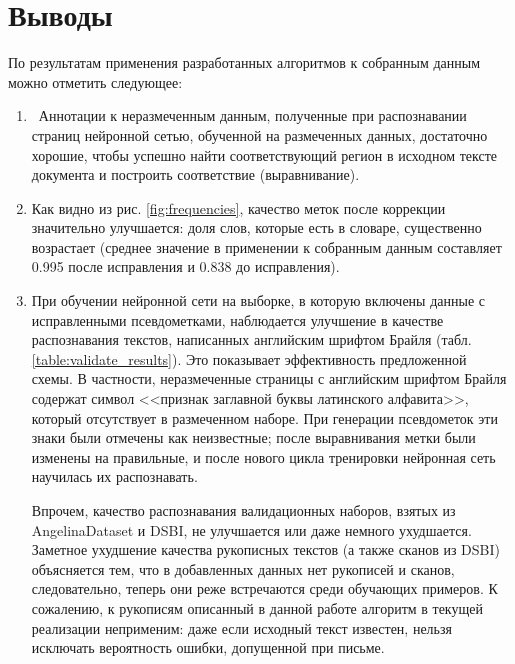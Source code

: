 \documentclass{main.tex}[subfiles]
\begin{document}
\newpage
\section{Выводы}

По результатам применения разработанных алгоритмов к собранным данным можно отметить следующее:
\begin{enumerate}[noitemsep]
	\item  Аннотации к неразмеченным данным, полученные при распознавании страниц нейронной сетью, обученной на размеченных данных, достаточно хорошие, чтобы успешно найти соответствующий регион в исходном тексте документа и построить соответствие (выравнивание).
	\item Как видно из рис. \ref{fig:frequencies}, качество меток после коррекции значительно улучшается: доля слов, которые есть в словаре, существенно возрастает (среднее значение в применении к собранным данным составляет 0.995 после исправления и 0.838 до исправления).
	\item При обучении нейронной сети на выборке, в которую включены данные с исправленными псевдометками, наблюдается улучшение в качестве распознавания текстов, написанных английским шрифтом Брайля (табл. \ref{table:validate_results}).
	Это показывает эффективность предложенной схемы.
	В частности, неразмеченные страницы с английским шрифтом Брайля содержат символ <<признак заглавной буквы латинского алфавита>>, который отсутствует в размеченном наборе.
	При генерации псевдометок эти знаки были отмечены как неизвестные; после выравнивания метки были изменены на правильные, и после нового цикла тренировки нейронная сеть научилась их распознавать.

	Впрочем, качество распознавания валидационных наборов, взятых из An\-ge\-li\-na\-Da\-ta\-set и DSBI, не улучшается или даже немного ухудшается.
	Заметное ухудшение качества рукописных текстов (а также сканов из DSBI) объясняется тем, что в добавленных данных нет рукописей и сканов, следовательно, теперь они реже встречаются среди обучающих примеров.
	К сожалению, к рукописям описанный в данной работе алгоритм в текущей реализации неприменим: даже если исходный текст известен, нельзя исключать вероятность ошибки, допущенной при письме.
\end{enumerate}
\end{document}
